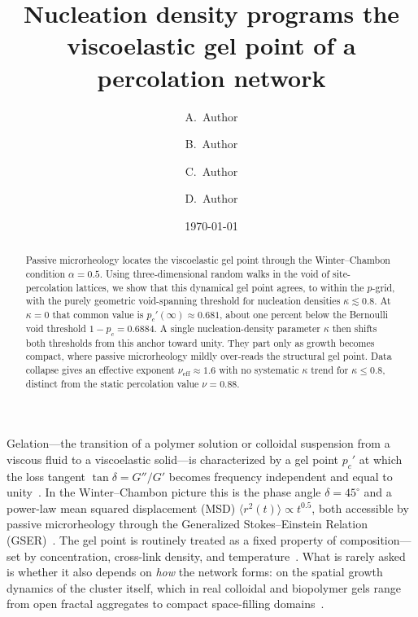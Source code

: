 \documentclass[aps,prl,twocolumn,superscriptaddress,floatfix,nofootinbib,longbibliography]{revtex4-2}
\newcommand{\msd}{\langle r^2(t)\rangle}
\newcommand{\pc}{p_c}
\newcommand{\pcp}{p_c'}
\newcommand{\kap}{\kappa}
\newcommand{\nueff}{\nu_{\mathrm{eff}}}
\begin{document}
\title{Nucleation density programs the viscoelastic gel point of a percolation network}

\author{A.~Author}
\author{B.~Author}
\author{C.~Author}
\author{D.~Author}
\affiliation{[Affiliation], [Institution], [City], [Country]}

\date{\today}

\begin{abstract}
Passive microrheology locates the viscoelastic gel point through the Winter--Chambon condition $\alpha=0.5$. Using three-dimensional random walks in the void of site-percolation lattices, we show that this dynamical gel point agrees, to within the $p$-grid, with the purely geometric void-spanning threshold for nucleation densities $\kap\lesssim0.8$. At $\kap=0$ that common value is $\pcp(\infty)\approx0.681$, about one percent below the Bernoulli void threshold $1-\pc=0.6884$. A single nucleation-density parameter $\kap$ then shifts both thresholds from this anchor toward unity. They part only as growth becomes compact, where passive microrheology mildly over-reads the structural gel point. Data collapse gives an effective exponent $\nueff\approx1.6$ with no systematic $\kap$ trend for $\kap\le0.8$, distinct from the static percolation value $\nu=0.88$.
\end{abstract}

\maketitle

Gelation---the transition of a polymer solution or colloidal suspension from a viscous fluid to a viscoelastic solid---is characterized by a gel point $\pcp$ at which the loss tangent $\tan\delta = G''/G'$ becomes frequency independent and equal to unity~\cite{Chambon1987,Winter1987}. In the Winter--Chambon picture this is the phase angle $\delta=45^{\circ}$ and a power-law mean squared displacement (MSD) $\msd\propto t^{0.5}$, both accessible by passive microrheology through the Generalized Stokes--Einstein Relation (GSER)~\cite{Mason1995,Mason2000,Squires2010fluid}. The gel point is routinely treated as a fixed property of composition---set by concentration, cross-link density, and temperature~\cite{Rubinstein2003,Larson1999}. What is rarely asked is whether it also depends on \emph{how} the network forms: on the spatial growth dynamics of the cluster itself, which in real colloidal and biopolymer gels range from open fractal aggregates to compact space-filling domains~\cite{Trappe2001,Coniglio2004,Ng2008}.
\end{document}
